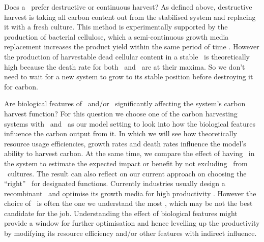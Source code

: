 \documentclass[../thesis.tex]{subfiles} %
\begin{document}
Does a \pbs\ prefer destructive or continuous harvest?  As defined above, destructive harvest is taking all carbon content out from the stabilised system and replacing it with a fresh culture.  This method is experimentally supported by the production of bacterial cellulose, which a semi-continuous growth media replacement increases the product yield within the same period of time \autocite{aytekin2016statistical}.  However the production of harvestable dead cellular content in a stable \pbs\ is theoretically high because the death rate for both \phy\ and \bac\ are at their maxima.  So we don’t need to wait for a new system to grow to its stable position before destroying it for carbon.

Are biological features of \phy\ and/or \bac\ significantly affecting the system’s carbon harvest function?  For this question we choose one of the carbon harvesting systems with \phy\ and \bac\ as our model setting to look into how the biological features influence the carbon output from it.  In which we will see how theoretically resource usage efficiencies, growth rates and death rates influence the model’s ability to harvest carbon.  At the same time, we compare the effect of having \bac\ in the system to estimate the expected impact or benefit by not excluding \bac\ from \phy\ cultures.  The result can also reflect on our current approach on choosing the ``right” \bac\ for designated functions.  Currently industries usually design a recombinant \bac\ and optimise its growth media for high productivity \autocite{dash2013marine,naik2013lead,huang2012industrial,evanson_2019}.  However the choice of \bac\ is often the one we understand the most \autocite{huang2012industrial}, which may be not the best candidate for the job.  Understanding the effect of biological features might provide a window for further optimisation and hence levelling up the productivity by modifying its resource efficiency and/or other features with indirect influence.
\end{document}
